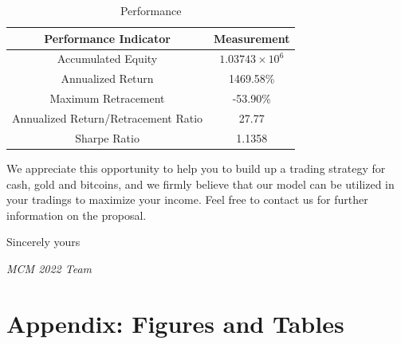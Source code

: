\documentclass[12pt,a4paper]{article}
\begin{document}
\begin{spacing}{1.2}
	\begin{table}[H]
	\renewcommand{\arraystretch}{1.5}
	\caption{Performance}
	\label{table:memo_performance}
	\begin{center}
		{\footnotesize
			\begin{tabular}{c c }
				\toprule
				Performance Indicator & Measurement\\
				\midrule
				Accumulated Equity & $1.03743 \times 10^6$ \\
				Annualized Return & 1469.58\% \\
				Maximum Retracement & -53.90\% \\
				Annualized Return/Retracement Ratio & 27.77 \\
				Sharpe Ratio & 1.1358 \\
				\bottomrule
		\end{tabular}}
	\end{center}	
\end{table}


We appreciate this opportunity to help you to build up a trading strategy for cash, gold and bitcoins, and we firmly believe that our model can be utilized in your tradings to maximize your income. Feel free to contact us for further information on the proposal.

Sincerely yours

\textit{MCM 2022 Team}



\end{spacing}


\newpage
\appendix
\addtocounter{page}{-1}
\thispagestyle{empty}

\section*{Appendix: Figures and Tables}
\label{sec:AppendixFT}
\end{document}
